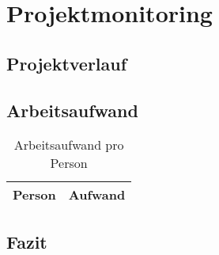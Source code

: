\chapter{Projektmonitoring}
\label{projektmonitoring}

\section{Projektverlauf}

\section{Arbeitsaufwand}

\begin{table}[H]
\centering
\begin{tabular}{|l|l|}
\hline 
\textbf{Person} & \textbf{Aufwand} \\ 
\hline 
\hline 
\hline 
\end{tabular}
\caption{Arbeitsaufwand pro Person}
\label{projektmanagement-arbeitsaufwand}
\end{table} 

\section{Fazit}